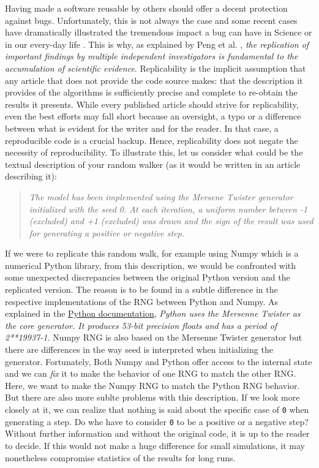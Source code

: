 \documentclass[a4paper,11pt]{article}
\begin{document}
Having made a software reusable by others should offer a decent protection
against bugs. Unfortunately, this is not always the case and some recent cases
have dramatically illustrated the tremendous impact a bug can have in Science
\citep{Eklund:2016} or in our every-day life \citep{Durumeric:2014}. This is
why, as explained by Peng et al. \cite{Peng:2006}, {\em the replication of
  important findings by multiple independent investigators is fundamental to
  the accumulation of scientific evidence}. Replicability is the implicit
assumption that any article that does not provide the code source makes: that
the description it provides of the algorithms is sufficiently precise and
complete to re-obtain the results it presents. While every published article
should strive for replicability, even the best efforts may fall short because
an oversight, a typo or a difference between what is evident for the writer
and for the reader. In that case, a reproducible code is a crucial backup. Hence,
replicability does not negate the necessity of reproducibility. To illustrate
this, let us consider what could be the textual description of your random
walker (as it would be written in an article describing it):
%
\begin{quotation}
{\em The model has been implemented using the Mersene Twister generator initialized with the seed 0. At each iteration, a uniform number between -1 (excluded) and +1 (excluded) was drawn and the sign of the result was used for generating a positive or negative step.}
\end{quotation}
%
If we were to replicate this random walk, for example using Numpy which is a
numerical Python library, from this description, we would be confronted with some
unexpected discrepancies between the original Python version and the replicated
version. The reason is to be found in a subtle difference in the respective
implementations of the RNG between Python and Numpy. As explained in the
\href{https://docs.python.org/3.6/library/random.html}{Python documentation},
{\em Python uses the Mersenne Twister as the core generator. It produces
53-bit precision floats and has a period of 2**19937-1.} Numpy RNG is
also based on the Mersenne Twister generator but there are differences in the
way seed is interpreted when initializing the generator. Fortunately, Both
Numpy and Python offer access to the internal state and we can {\em fix} it to
make the behavior of one RNG to match the other RNG. Here, we want to make the
Numpy RNG to match the Python RNG behavior. But there are also more sublte
problems with this description. If we look more closely at it, we can realize
that nothing is said about the specific case of {\tt 0} when generating a step.
Do whe have to consider {\tt 0} to be a positive or a negative step? Without
further information and without the original code, it is up to the reader to
decide. If this would not make a huge difference for small simulations, it
may nonetheless compromise statistics of the results for long runs.\\
\end{document}

